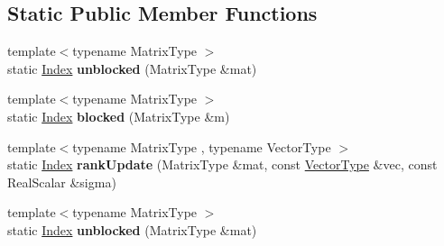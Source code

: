 \subsection*{Static Public Member Functions}
\begin{DoxyCompactItemize}
\item 
\mbox{\label{struct_eigen_1_1internal_1_1llt__inplace_3_01_scalar_00_01_lower_01_4_ac9fa1e5e9b89b26532f6a6809ab33c4e}} 
{\footnotesize template$<$typename Matrix\+Type $>$ }\\static \hyperlink{namespace_eigen_a62e77e0933482dafde8fe197d9a2cfde}{Index} {\bfseries unblocked} (Matrix\+Type \&mat)
\item 
\mbox{\label{struct_eigen_1_1internal_1_1llt__inplace_3_01_scalar_00_01_lower_01_4_a88a62e53c6984ed5e0512a04b637b5b7}} 
{\footnotesize template$<$typename Matrix\+Type $>$ }\\static \hyperlink{namespace_eigen_a62e77e0933482dafde8fe197d9a2cfde}{Index} {\bfseries blocked} (Matrix\+Type \&m)
\item 
\mbox{\label{struct_eigen_1_1internal_1_1llt__inplace_3_01_scalar_00_01_lower_01_4_ae02f3e4d3e4abf21624333d43762dd81}} 
{\footnotesize template$<$typename Matrix\+Type , typename Vector\+Type $>$ }\\static \hyperlink{namespace_eigen_a62e77e0933482dafde8fe197d9a2cfde}{Index} {\bfseries rank\+Update} (Matrix\+Type \&mat, const \hyperlink{struct_vector_type}{Vector\+Type} \&vec, const Real\+Scalar \&sigma)
\item 
\mbox{\label{struct_eigen_1_1internal_1_1llt__inplace_3_01_scalar_00_01_lower_01_4_ac9fa1e5e9b89b26532f6a6809ab33c4e}} 
{\footnotesize template$<$typename Matrix\+Type $>$ }\\static \hyperlink{namespace_eigen_a62e77e0933482dafde8fe197d9a2cfde}{Index} {\bfseries unblocked} (Matrix\+Type \&mat)
\item 
\mbox{\label{struct_eigen_1_1internal_1_1llt__inplace_3_01_scalar_00_01_lower_01_4_a88a62e53c6984ed5e0512a04b637b5b7}} 

\end{DoxyCompactItemize}
